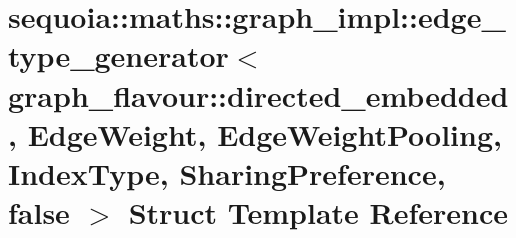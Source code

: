 \hypertarget{structsequoia_1_1maths_1_1graph__impl_1_1edge__type__generator_3_01graph__flavour_1_1directed__e5563bfe8942c6d0abe1edf2ec49203fb}{}\section{sequoia\+::maths\+::graph\+\_\+impl\+::edge\+\_\+type\+\_\+generator$<$ graph\+\_\+flavour\+::directed\+\_\+embedded, Edge\+Weight, Edge\+Weight\+Pooling, Index\+Type, Sharing\+Preference, false $>$ Struct Template Reference}
\label{structsequoia_1_1maths_1_1graph__impl_1_1edge__type__generator_3_01graph__flavour_1_1directed__e5563bfe8942c6d0abe1edf2ec49203fb}
